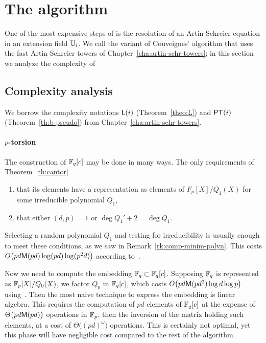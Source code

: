 

\section{The algorithm }
\label{sec:C2-AS}

One of the most expensive steps of \ctwo{} is the resolution of an
Artin-Schreier equation in an extension field $\mathbb{U}_i$. We call \ctwoas{}
the variant of Couveignes' algorithm that uses the fast Artin-Schreier
towers of Chapter~\ref{cha:artin-schr-towers}; in this section we
analyze the complexity of \ctwoas{}

\subsection{Complexity analysis}
\label{sec:C2-AS:complexity}
We borrow the complexity notations $\mathsf{L}(i)$ (Theorem~\ref{theo:L})
and $\mathsf{PT}(i)$ (Theorem~\ref{th:b-pseudo}) from
Chapter~\ref{cha:artin-schr-towers}.

\paragraph{$p$-torsion}
The construction of $\mathbb{F}_q[c]$ may be done in many ways. The only
requirements of Theorem~\ref{th:cantor}
\begin{enumerate}
\item that its elements have a representation as elements of
  $F_p[X]/Q_1(X)$ for some irreducible polynomial $Q_1$,
\item that either $(d,p)=1$ or $\deg Q_1' + 2 = \deg Q_1$.
\end{enumerate}
Selecting a random polynomial $Q_1$ and testing for irreducibility is
usually enough to meet these conditions, as we saw in
Remark~\ref{rk:comp-minim-polyn}.  This costs $O\bigl(pd\mathsf{M}(pd)\log
(pd)\log(p^2d)\bigr)$ according to~\cite[Th.  14.42]{vzGG}.

Now we need to compute the embedding $\mathbb{F}_q\subset\mathbb{F}_q[c]$. Supposing
$\mathbb{F}_q$ is represented as $\mathbb{F}_p[X]/Q_0(X)$, we factor $Q_0$ in
$\mathbb{F}_q[c]$, which costs $O\bigl(pd\mathsf{M}(pd^2)\log d\log p\bigr)$
using~\cite[Coro. 14.16]{vzGG}. Then the most naive technique to
express the embedding is linear algebra. This requires the computation
of $pd$ elements of $\mathbb{F}_q[c]$ at the expense of
$\Theta\bigl(pd\mathsf{M}(pd)\bigr)$ operations in $\mathbb{F}_p$, then the
inversion of the matrix holding such elements, at a cost of
$\Theta\bigl((pd)^\omega\bigr)$ operations. This is certainly not
optimal, yet this phase will have negligible cost compared to the rest
of the algorithm.

